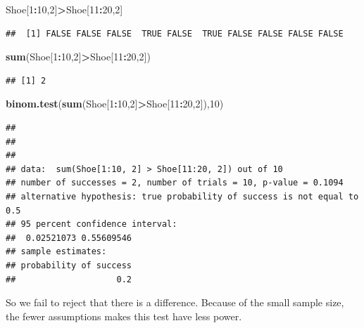 \documentclass[]{book}
\newenvironment{Shaded}{\begin{snugshade}}{\end{snugshade}}
\newcommand{\KeywordTok}[1]{\textcolor[rgb]{0.13,0.29,0.53}{\textbf{#1}}}
\newcommand{\DecValTok}[1]{\textcolor[rgb]{0.00,0.00,0.81}{#1}}
\newcommand{\OperatorTok}[1]{\textcolor[rgb]{0.81,0.36,0.00}{\textbf{#1}}}
\newcommand{\NormalTok}[1]{#1}
\theoremstyle{definition}
\theoremstyle{definition}
\theoremstyle{definition}
\theoremstyle{remark}
\begin{document}
\begin{Shaded}
\begin{Highlighting}[]
\NormalTok{Shoe[}\DecValTok{1}\OperatorTok{:}\DecValTok{10}\NormalTok{,}\DecValTok{2}\NormalTok{]}\OperatorTok{>}\NormalTok{Shoe[}\DecValTok{11}\OperatorTok{:}\DecValTok{20}\NormalTok{,}\DecValTok{2}\NormalTok{]}
\end{Highlighting}
\end{Shaded}

\begin{verbatim}
##  [1] FALSE FALSE FALSE  TRUE FALSE  TRUE FALSE FALSE FALSE FALSE
\end{verbatim}

\begin{Shaded}
\begin{Highlighting}[]
\KeywordTok{sum}\NormalTok{(Shoe[}\DecValTok{1}\OperatorTok{:}\DecValTok{10}\NormalTok{,}\DecValTok{2}\NormalTok{]}\OperatorTok{>}\NormalTok{Shoe[}\DecValTok{11}\OperatorTok{:}\DecValTok{20}\NormalTok{,}\DecValTok{2}\NormalTok{])}
\end{Highlighting}
\end{Shaded}

\begin{verbatim}
## [1] 2
\end{verbatim}

\begin{Shaded}
\begin{Highlighting}[]
\KeywordTok{binom.test}\NormalTok{(}\KeywordTok{sum}\NormalTok{(Shoe[}\DecValTok{1}\OperatorTok{:}\DecValTok{10}\NormalTok{,}\DecValTok{2}\NormalTok{]}\OperatorTok{>}\NormalTok{Shoe[}\DecValTok{11}\OperatorTok{:}\DecValTok{20}\NormalTok{,}\DecValTok{2}\NormalTok{]),}\DecValTok{10}\NormalTok{)}
\end{Highlighting}
\end{Shaded}

\begin{verbatim}
## 
## 
## 
## data:  sum(Shoe[1:10, 2] > Shoe[11:20, 2]) out of 10
## number of successes = 2, number of trials = 10, p-value = 0.1094
## alternative hypothesis: true probability of success is not equal to 0.5
## 95 percent confidence interval:
##  0.02521073 0.55609546
## sample estimates:
## probability of success 
##                    0.2
\end{verbatim}

So we fail to reject that there is a difference. Because of the small
sample size, the fewer assumptions makes this test have less power.
\end{document}
